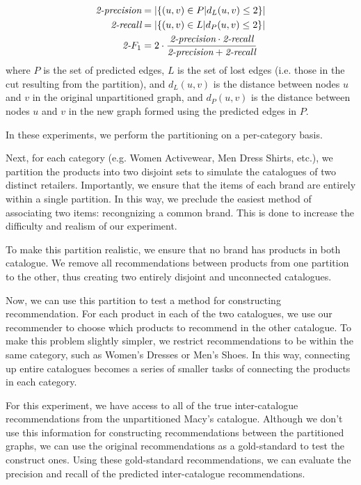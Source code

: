 \documentclass[11pt]{article}
\begin{document}
\begin{align}
\text{\em 2-precision} &= \left|\left\{(u,v) \in P | d_L(u,v) \leq 2
\right\}\right|
\\\text{\em 2-recall} &= \left|\left\{(u,v) \in L | d_P(u,v) \leq 2
\right\}\right|
\\\text{\em 2-}F_1 &= 2\cdot \frac{\text{\em 2-precision} \cdot \text{\em
2-recall}}{\text{\em 2-precision} + \text{\em 2-recall}}
\end{align}
where $P$ is the set of predicted edges, $L$ is the set of lost edges (i.e.
those in the cut resulting from the partition), and $d_L(u,v)$ is the distance
between nodes $u$ and $v$ in the original unpartitioned graph, and $d_P(u,v)$ is
the distance between nodes $u$ and $v$ in the new graph formed using the
predicted edges in $P$.


In these experiments, we perform the partitioning on a per-category basis. 










Next, for each category (e.g. Women Activewear, Men Dress Shirts, etc.), we
partition the products into two disjoint sets to simulate the catalogues of two
distinct retailers. Importantly, we ensure that the items of each brand are
entirely within a single partition. In this way, we preclude the easiest method
of associating two items: recongnizing a common brand. This is done to increase
the difficulty and realism of our experiment.

To make this partition realistic, we
ensure that no brand has products in both catalogue. We remove all
recommendations between products from one partition to the other, thus creating
two entirely disjoint and unconnected catalogues.

Now, we can use this partition to test a method for constructing recommendation.
For each product in each of the two catalogues, we use our recommender to choose
which products to recommend in the other catalogue. To make this problem
slightly simpler, we restrict recommendations to be within the same category,
such as Women's Dresses or Men's Shoes. In this way, connecting up entire
catalogues becomes a series of smaller tasks of connecting the products in each
category.

For this experiment, we have access to all of the true inter-catalogue
recommendations from the unpartitioned Macy's catalogue. Although we don't use
this information for constructing recommendations between the partitioned
graphs, we can use the original recommendations as a gold-standard to test the
construct ones. Using these gold-standard recommendations, we can evaluate the
precision and recall of the predicted inter-catalogue recommendations.
\end{document}
